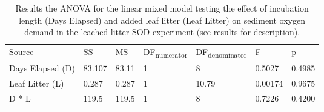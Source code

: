 \begin{table}
\label{tab:leached_SOD_ANOVA}
\begin{tabular}{ l l l l l l l }

Source           & SS      & MS     & DF\textsubscript{numerator} & DF\textsubscript{denominator} & F       & p  \\
Days Elapsed (D) & 83.107  & 83.11  & 1                           & 8                             & 0.5027  & 0.4985 \\
Leaf Litter (L)  & 0.287   & 0.287  & 1                           & 10.79                         & 0.00174 & 0.9675 \\
D * L            & 119.5   & 119.5  & 1                           & 8                            & 0.7226  & 0.4200 \\

\end{tabular}
\caption{Results the ANOVA for the linear mixed model testing the effect of incubation length (Days Elapsed) and added leaf litter (Leaf Litter) on sediment oxygen demand in the leached litter SOD experiment (see results for description).}
\end{table}